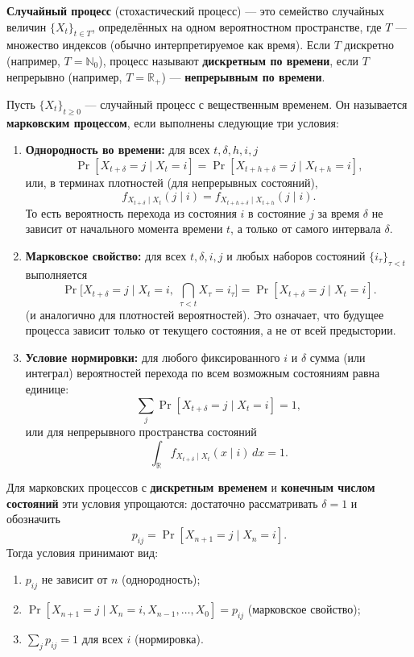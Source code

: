 \documentclass[10pt]{article}
\begin{document}
\begin{definition}
\textbf{Случайный процесс} (стохастический процесс) — это семейство случайных величин $\{X_t\}_{t \in T}$, определённых на одном вероятностном пространстве, где $T$ — множество индексов (обычно интерпретируемое как время). Если $T$ дискретно (например, $T = \mathbb{N}_0$), процесс называют \textbf{дискретным по времени}, если $T$ непрерывно (например, $T = \mathbb{R}_+$) — \textbf{непрерывным по времени}.
\end{definition}
\begin{definition}

Пусть $\{X_t\}_{t\ge 0}$ — случайный процесс с вещественным временем. Он называется \textbf{марковским процессом}, если выполнены следующие три условия:

\begin{enumerate}
    \item \textbf{Однородность во времени:} для всех $t, \delta, h, i, j$
    \[
    \Pr[X_{t+\delta}=j \mid X_t=i] = \Pr[X_{t+h+\delta}=j \mid X_{t+h}=i],
    \]
    или, в терминах плотностей (для непрерывных состояний),
    \[
    f_{X_{t+\delta}\mid X_t}(j\mid i) = f_{X_{t+h+\delta}\mid X_{t+h}}(j\mid i).
    \]
    То есть вероятность перехода из состояния $i$ в состояние $j$ за время $\delta$ не зависит от начального момента времени $t$, а только от самого интервала $\delta$.

    \item \textbf{Марковское свойство:} для всех $t, \delta, i, j$ и любых наборов состояний $\{i_\tau\}_{\tau<t}$ выполняется
    \[
    \Pr\bigl[X_{t+\delta}=j \mid X_t=i,\; \bigcap_{\tau<t} X_\tau=i_\tau\bigr] = \Pr[X_{t+\delta}=j \mid X_t=i].
    \]
    (и аналогично для плотностей вероятностей). Это означает, что будущее процесса зависит только от текущего состояния, а не от всей предыстории.

    \item \textbf{Условие нормировки:} для любого фиксированного $i$ и $\delta$ сумма (или интеграл) вероятностей перехода по всем возможным состояниям равна единице:
    \[
    \sum_j \Pr[X_{t+\delta}=j \mid X_t=i] = 1,
    \]
    или для непрерывного пространства состояний
    \[
    \int_{\mathbb{R}} f_{X_{t+\delta}\mid X_t}(x\mid i)\,dx = 1.
    \]
\end{enumerate}

Для марковских процессов с \textbf{дискретным временем} и \textbf{конечным числом состояний} эти условия упрощаются: достаточно рассматривать $\delta=1$ и обозначить
\[
p_{ij} = \Pr[X_{n+1}=j \mid X_n=i].
\]
Тогда условия принимают вид:
\begin{enumerate}
    \item $p_{ij}$ не зависит от $n$ (однородность);
    \item $\Pr[X_{n+1}=j \mid X_n=i, X_{n-1},\dots,X_0] = p_{ij}$ (марковское свойство);
    \item $\sum_{j} p_{ij} = 1$ для всех $i$ (нормировка).
\end{enumerate}
\end{definition}
\end{document}
